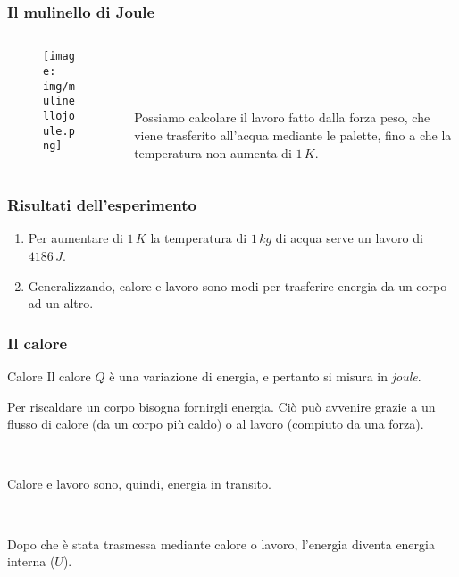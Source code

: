 \documentclass[]{beamer}
\theoremstyle{plain}
\begin{document}
\begin{frame}
\frametitle{Il mulinello di Joule}

\begin{columns}
\begin{column}{0.5\textwidth}
\begin{figure}
\texttt{[image: img/mulinellojoule.png]}
\end{figure}
\end{column}
\begin{column}{0.4\textwidth}\pause

~

~


Possiamo calcolare il lavoro fatto dalla forza peso, che viene trasferito all'acqua mediante le palette, fino a che la temperatura non aumenta di $ 1 \, K $.
\end{column}
\end{columns}
\end{frame}

\begin{frame}
\frametitle{Risultati dell'esperimento}
\begin{enumerate}
  \item Per aumentare di $ 1 \, K $ la temperatura di $ 1 \, kg $ di acqua serve un lavoro di $ 4186 \, J $.\pause
  \item Generalizzando, \alert{calore e lavoro sono modi per trasferire energia da un corpo ad un altro}.
\end{enumerate}

\begin{figure}
\end{figure}
\end{frame}


\begin{frame}
\frametitle{Il calore}
\begin{block}{Calore}
Il calore $ Q $ è una variazione di energia, e pertanto si misura in \emph{joule}.
\end{block}\pause

Per riscaldare un corpo bisogna fornirgli energia. Ciò può avvenire grazie a un flusso di calore (da un corpo più caldo) o al lavoro (compiuto da una forza).\pause

~

Calore e lavoro sono, quindi, \alert{energia in transito}.\pause

~

Dopo che è stata trasmessa mediante calore o lavoro, l’energia
diventa \alert{energia interna} ($ U $).

\end{frame}
\end{document}
